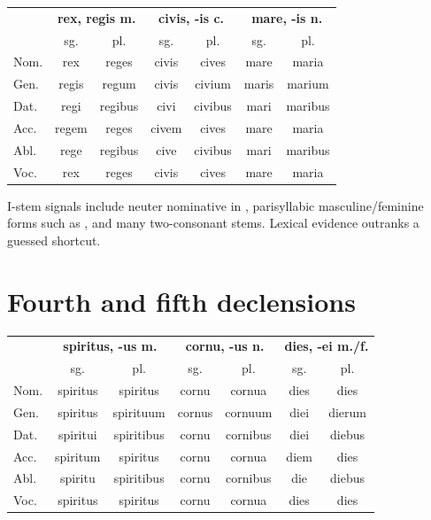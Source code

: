 \begin{center}\small
\begin{tabular}{@{}lcccccc@{}}
  \toprule & \multicolumn{2}{c}{\textbf{rex, regis m.}} &
  \multicolumn{2}{c}{\textbf{civis, -is c.}} &
  \multicolumn{2}{c}{\textbf{mare, -is n.}} \\
  & sg. & pl. & sg. & pl. & sg. & pl. \\
  \midrule
  Nom. & rex & reges & civis & cives & mare & maria \\
  Gen. & regis & regum & civis & civium & maris & marium \\
  Dat. & regi & regibus & civi & civibus & mari & maribus \\
  Acc. & regem & reges & civem & cives & mare & maria \\
  Abl. & rege & regibus & cive & civibus & mari & maribus \\
  Voc. & rex & reges & civis & cives & mare & maria \\
  \bottomrule
\end{tabular}
\end{center}

I-stem signals include neuter nominative in , parisyllabic
masculine/feminine forms such as , and many two-consonant stems.
Lexical evidence outranks a guessed shortcut.

\section{Fourth and fifth declensions}

\begin{center}\small
\begin{tabular}{@{}lcccccc@{}}
  \toprule & \multicolumn{2}{c}{\textbf{spiritus, -us m.}} &
  \multicolumn{2}{c}{\textbf{cornu, -us n.}} &
  \multicolumn{2}{c}{\textbf{dies, -ei m./f.}} \\
  & sg. & pl. & sg. & pl. & sg. & pl. \\
  \midrule
  Nom. & spiritus & spiritus & cornu & cornua & dies & dies \\
  Gen. & spiritus & spirituum & cornus & cornuum & diei & dierum \\
  Dat. & spiritui & spiritibus & cornu & cornibus & diei & diebus \\
  Acc. & spiritum & spiritus & cornu & cornua & diem & dies \\
  Abl. & spiritu & spiritibus & cornu & cornibus & die & diebus \\
  Voc. & spiritus & spiritus & cornu & cornua & dies & dies \\
  \bottomrule
\end{tabular}
\end{center}

